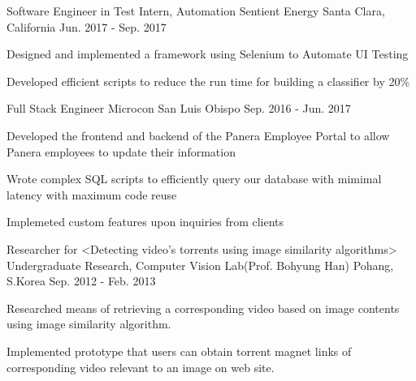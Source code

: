 


\begin{cventries}


\cventry
{Software Engineer in Test Intern, Automation} %
{Sentient Energy} %
{Santa Clara, California} %
{Jun. 2017 - Sep. 2017} %
{ %
\begin{cvitems}
\item {Designed and implemented a framework using Selenium to Automate UI Testing}
\item {Developed efficient scripts to reduce the run time for building a classifier by 20\%}
\end{cvitems}
}


\cventry
{Full Stack Engineer} %
{Microcon} %
{San Luis Obispo} %
{Sep. 2016 - Jun. 2017} %
{ %
\begin{cvitems}
\item {Developed the frontend and backend of the Panera Employee Portal to allow Panera employees to update their information}
\item {Wrote complex SQL scripts to efficiently query our database with mimimal latency with maximum code reuse}
\item {Implemeted custom features upon inquiries from clients}
\end{cvitems}
}


\cventry
{Researcher for <Detecting video’s torrents using image similarity algorithms>} %
{Undergraduate Research, Computer Vision Lab(Prof. Bohyung Han)} %
{Pohang, S.Korea} %
{Sep. 2012 - Feb. 2013} %
{ %
\begin{cvitems}
\item {Researched means of retrieving a corresponding video based on image contents using image similarity algorithm.}
\item {Implemented prototype that users can obtain torrent magnet links of corresponding video relevant to an image on web site.}
\end{cvitems} 
}


\end{cventries}
